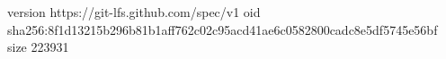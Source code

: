 version https://git-lfs.github.com/spec/v1
oid sha256:8f1d13215b296b81b1aff762c02c95acd41ae6c0582800cadc8e5df5745e56bf
size 223931
